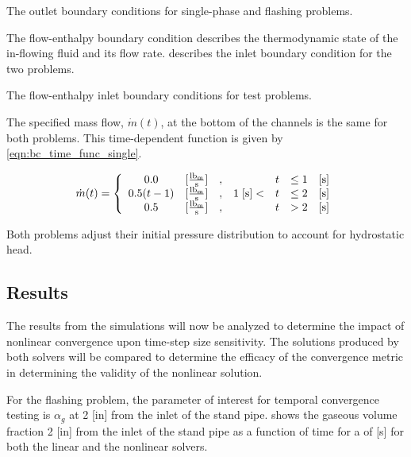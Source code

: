 \begin{table}[h!t]
\centering
\singlespace

\caption{The outlet boundary conditions for single-phase and flashing problems.}
\label{tab:dualOutlet}
\end{table}

The flow-enthalpy boundary condition describes the thermodynamic state of the in-flowing fluid and its flow rate.
 describes the inlet boundary condition for the two problems.

\begin{table}[ht]
\centering
\singlespace

\caption{The flow-enthalpy inlet boundary conditions for test problems.}
\label{tab:dualInlet}
\end{table}

The specified mass flow, $\dot{m}(t)$, at the bottom of the channels is the same for both problems. 
This time-dependent function is given by \eqref{eqn:bc_time_func_single}.

\begin{equation}
\label{eqn:bc_time_func_single}
\dot{m}(t) = \left\{
\begin{array}{cclrcll}
 0.0           & [\frac{ \lbm{} }{\text{s}}] & , &                & t & \leq 1 & [\text{s}] \\
 0.5 ( t - 1)  & [\frac{ \lbm{} }{\text{s}}] & , & 1\; [\text{s}] < & t & \leq 2 & [\text{s}] \\
 0.5           & [\frac{ \lbm{} }{\text{s}}] & , &                & t & > 2    & [\text{s}]
\end{array}\right.
\end{equation}

Both problems adjust their initial pressure distribution to account for hydrostatic head.

\subsection{Results}
\label{subsect:single_results}

The results from the simulations will now be analyzed to determine the impact of nonlinear convergence upon time-step size sensitivity.
The solutions produced by both solvers will be compared to determine the efficacy of the convergence metric in determining the validity of the nonlinear solution.

For the flashing problem, the parameter of interest for temporal convergence testing is $\alpha_g$ at 2 [in] from the inlet of the stand pipe.
 shows the gaseous volume fraction 2 [in] from the inlet of the stand pipe as a function of time for a \dtmax{} of  [s] for both the linear and the nonlinear solvers.

